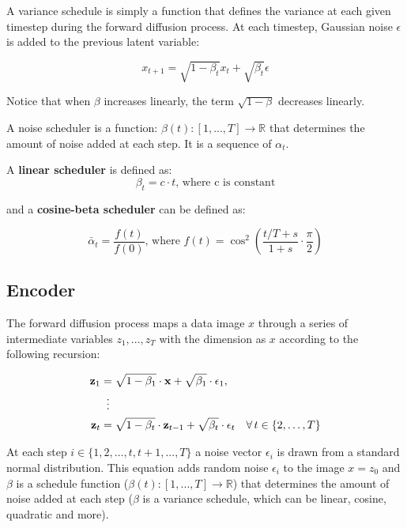 A variance schedule is simply a function that defines the variance at each given timestep during the forward diffusion process. At each timestep, Gaussian noise $\epsilon$ is added to the previous latent variable:

\[
    x_{t+1} = \sqrt{1 - \beta_t} x_t + \sqrt{\beta_t} \epsilon
\]

Notice that when $\beta$ increases linearly, the term $\sqrt{1-\beta}$ decreases linearly. 

A noise scheduler is a function: $\beta(t):[1, ..., T] \rightarrow \mathbb{R}$ that determines the amount of noise added at each step. It is a sequence of $\alpha_t$.

A \textbf{linear scheduler} is defined as:
\[
    \beta_t = c \cdot t \text{, where c is constant}
\]

and a \textbf{cosine-beta scheduler} can be defined as:

\[
    \bar{\alpha}_t = \frac{f(t)}{f(0)} \text{, where } f(t) = \cos^2 \left( \frac{t/T + s}{1+s} \cdot \frac{\pi}{2} \right)
\]








\subsection{Encoder}

The forward diffusion process maps a data image $x$ through a series of intermediate variables $z_1, ..., z_T$ with the dimension as $x$ according to the following recursion:

\begin{equation}
    \begin{aligned}
    \mathbf{z}_1 &= \sqrt{1 - \beta_1} \cdot \mathbf{x} + \sqrt{\beta_1} \cdot \epsilon_1, \\
    &\;\;\vdots \notag \\
    \mathbf{z}_t &= \sqrt{1 - \beta_t} \cdot \mathbf{z}_{t-1} + \sqrt{\beta_t} \cdot \epsilon_t \quad \forall \, t \in \{2, \ldots, T\}
    \end{aligned}
\end{equation}

At each step $i \in \{1, 2, ..., t, t+1, ..., T\}$ a noise vector $\epsilon_i$ is drawn from a standard normal distribution. This equation adds random noise $\epsilon_i$ to the image $x = z_0$ and $\beta$ is a schedule function ($\beta(t):[1, ..., T] \rightarrow \mathbb{R}$) that determines the amount of noise added at each step ($\beta$ is a variance schedule, which can be linear, cosine, quadratic and more). 

